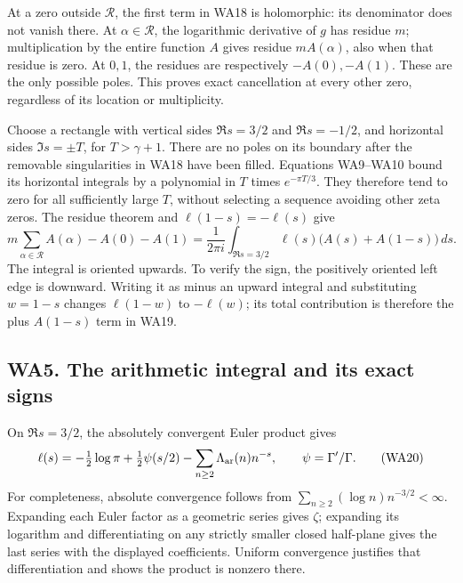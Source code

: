 \documentclass[
  10pt,
  a4paper,
]{article}
\begin{document}
At a zero outside \(\mathcal R\), the first term in WA18 is holomorphic:
its denominator does not vanish there. At \(\alpha\in\mathcal R\), the
logarithmic derivative of \(g\) has residue \(m\); multiplication by the
entire function \(A\) gives residue \(mA(\alpha)\), also when that
residue is zero. At \(0,1\), the residues are respectively
\(-A(0),-A(1)\). These are the only possible poles. This proves exact
cancellation at every other zero, regardless of its location or
multiplicity.

Choose a rectangle with vertical sides \(\Re s=3/2\) and \(\Re s=-1/2\),
and horizontal sides \(\Im s=\pm T\), for \(T>\gamma+1\). There are no
poles on its boundary after the removable singularities in WA18 have
been filled. Equations WA9--WA10 bound its horizontal integrals by a
polynomial in \(T\) times \(e^{-\pi T/3}\). They therefore tend to zero
for all sufficiently large \(T\), without selecting a sequence avoiding
other zeta zeros. The residue theorem and \(\ell(1-s)=-\ell(s)\) give \[
m\sum_{\alpha\in\mathcal R}A(\alpha)-A(0)-A(1)
=\frac1{2\pi i}\int_{\Re s=3/2}
\ell(s)\bigl(A(s)+A(1-s)\bigr)\,ds.
\tag{WA19}
\] The integral is oriented upwards. To verify the sign, the positively
oriented left edge is downward. Writing it as minus an upward integral
and substituting \(w=1-s\) changes \(\ell(1-w)\) to \(-\ell(w)\); its
total contribution is therefore the plus \(A(1-s)\) term in WA19.

\subsection{WA5. The arithmetic integral and its exact
signs}\label{wa5.-the-arithmetic-integral-and-its-exact-signs}

On \(\Re s=3/2\), the absolutely convergent Euler product gives \[
\ell(s)=-\tfrac12\log\pi+\tfrac12\psi(s/2)
-\sum_{n\ge2}\Lambda_{\rm ar}(n)n^{-s},
\qquad \psi=\Gamma'/\Gamma.
\tag{WA20}
\] For completeness, absolute convergence follows from
\(\sum_{n\ge2}(\log n)n^{-3/2}<\infty\). Expanding each Euler factor as
a geometric series gives \(\zeta\); expanding its logarithm and
differentiating on any strictly smaller closed half-plane gives the last
series with the displayed coefficients. Uniform convergence justifies
that differentiation and shows the product is nonzero there.
\end{document}
